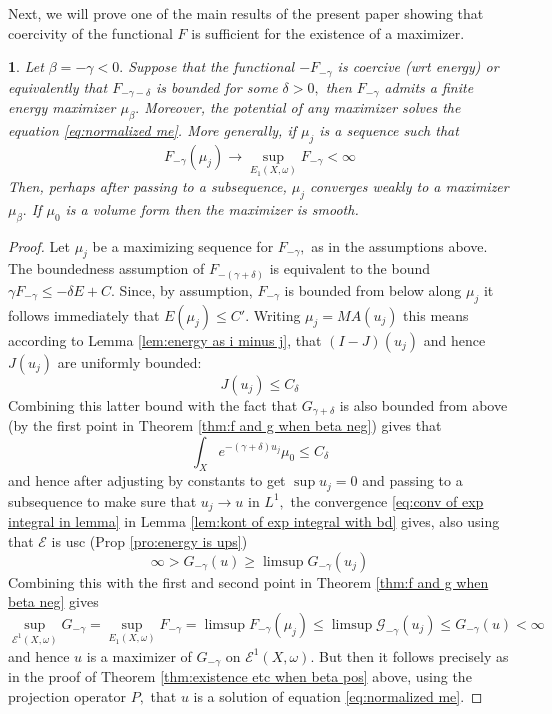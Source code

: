 \documentclass[11pt,oneside,english]{amsart}
\numberwithin{equation}{section}
\numberwithin{figure}{section}
\theoremstyle{plain}
\newtheorem{thm}{\protect\theoremname}[section]
\theoremstyle{plain}
\theoremstyle{plain}
\theoremstyle{plain}
\theoremstyle{remark}
\theoremstyle{definition}
\providecommand{\theoremname}{Theorem}
\begin{document}
Next, we will prove one of the main results of the present paper showing
that coercivity of the   functional $F$ is sufficient for the existence
of a maximizer. 
\begin{thm}
\label{thm:proper gives max of F beta neg}Let $\beta=-\gamma<0.$
Suppose that the functional $-F_{-\gamma}$ is coercive (wrt energy)
or equivalently that $F_{-\gamma-\delta}$ is bounded for some $\delta>0,$
then $F_{-\gamma}$ admits a finite energy maximizer $\mu_{\beta}.$
Moreover, the potential of any maximizer solves the  equation \ref{eq:normalized me}.
More generally, if $\mu_{j}$ is a sequence such that 
\[
F_{-\gamma}(\mu_{j})\rightarrow\sup_{E_{1}(X,\omega)}F_{-\gamma}<\infty
\]
 Then, perhaps after passing to a subsequence, $\mu_{j}$ converges
weakly to a maximizer $\mu_{\beta}.$ If $\mu_{0}$ is a volume form
then the maximizer is smooth.\end{thm}
\begin{proof}
Let $\mu_{j}$ be a maximizing sequence for $F_{-\gamma},$ as in
the assumptions above. The boundedness assumption of $F_{-(\gamma+\delta)}$
is equivalent to the bound $\gamma F_{-\gamma}\leq-\delta E+C.$ Since,
by assumption, $F_{-\gamma}$ is bounded from below along $\mu_{j}$
it follows immediately that $E(\mu_{j})\leq C'.$ Writing $\mu_{j}=MA(u_{j})$
this means according to Lemma \ref{lem:energy as i minus j}, that
$(I-J)(u_{j})$ and hence $J(u_{j})$ are uniformly bounded: 
\[
J(u_{j})\leq C_{\delta}
\]
 Combining this latter bound with the fact that $G_{\gamma+\delta}$
is also bounded from above (by the first point in Theorem \ref{thm:f and g when beta neg})
gives that 
\begin{equation}
\int_{X}e^{-(\gamma+\delta)u_{j}}\mu_{0}\leq C_{\delta}\label{eq:pf of thm coerc}
\end{equation}
 and hence after adjusting by constants to get $\sup u_{j}=0$ and
passing to a subsequence to make sure that $u_{j}\rightarrow u$ in
$L^{1},$ the convergence \ref{eq:conv of exp integral in lemma}
in Lemma \ref{lem:kont of exp integral with bd} gives, also using
that $\mathcal{E}$ is usc (Prop \ref{pro:energy is ups}) 
\[
\infty>G_{-\gamma}(u)\geq\limsup G_{-\gamma}(u_{j})
\]
 Combining this with the first and second point in Theorem \ref{thm:f and g when beta neg}
gives 
\[
\sup_{\mathcal{E}^{1}(X,\omega)}G_{-\gamma}=\sup_{E_{1}(X,\omega)}F_{-\gamma}=\limsup F_{-\gamma}(\mu_{j})\leq\limsup\mathcal{G}_{-\gamma}(u_{j})\leq G_{-\gamma}(u)<\infty
\]
 and hence $u$ is a maximizer of $G_{-\gamma}$ on $\mathcal{E}^{1}(X,\omega).$
But then it follows precisely as in the proof of Theorem \ref{thm:existence etc when beta pos}
above, using the projection operator $P,$ that $u$ is a solution
of equation \ref{eq:normalized me}. 
\end{proof}
\end{document}
